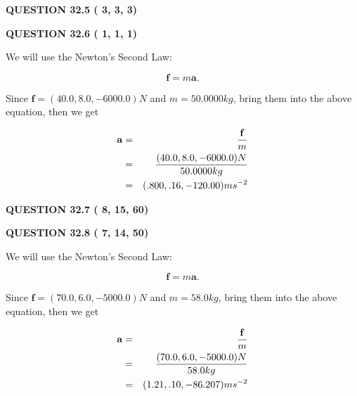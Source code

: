 \documentclass[12pt]{article}
\begin{document}
 
 
  
\vspace{0.2in}
  
{\textbf{\Large{QUESTION
32.5 
 (          3,          3,          3)
}}}
  
  
  
\vspace{0.2in}
  
{\textbf{\Large{QUESTION
32.6 
 (          1,          1,          1)
}}}
  
  


 
 

We will use the Newton's Second Law:
 
\[
\mathbf{f}=m\mathbf{a}.
\]
 
Since $\mathbf{f}= %
(40.0 , 8.0 , -6000.0) N$
and $m= %
50.0000kg$, bring them into the above equation, then we get
 
\begin{eqnarray*}
\mathbf{a}&=&\frac{\mathbf{f}}m  \\
&=&\frac{ %
(40.0 , 8.0 , -6000.0) N}{ %
50.0000kg}  \\
&=& %
(.800 , .16 , -120.00) ms^{-2}
\end{eqnarray*}
 
 
 
  
\vspace{0.2in}
  
{\textbf{\Large{QUESTION
32.7 
 (          8,         15,         60)
}}}
  
  
 
 

 
 
  
\vspace{0.2in}
  
{\textbf{\Large{QUESTION
32.8 
 (          7,         14,         50)
}}}
  
  
 
 

We will use the Newton's Second Law:
 
\[
\mathbf{f}=m\mathbf{a}.
\]
 
Since $\mathbf{f}= %
(70.0 , 6.0 , -5000.0) N$
and $m= %
58.0kg$, bring them into the above equation, then we get
 
\begin{eqnarray*}
\mathbf{a}&=&\frac{\mathbf{f}}m  \\
&=&\frac{ %
(70.0 , 6.0 , -5000.0) N}{ %
58.0kg}  \\
&=& %
(1.21 , .10 , -86.207) ms^{-2}
\end{eqnarray*}
 
\end{document}
